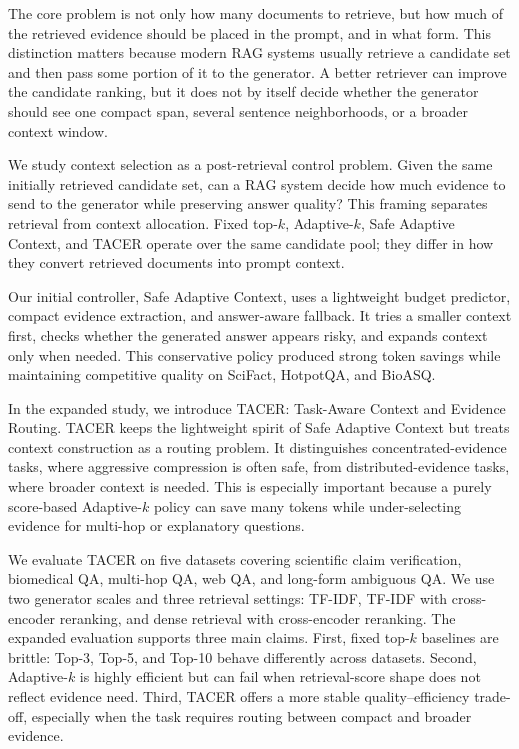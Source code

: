 \documentclass[11pt]{article}
\begin{document}
The core problem is not only how many documents to retrieve, but how much of the retrieved evidence should be placed in the prompt, and in what form. This distinction matters because modern RAG systems usually retrieve a candidate set and then pass some portion of it to the generator. A better retriever can improve the candidate ranking, but it does not by itself decide whether the generator should see one compact span, several sentence neighborhoods, or a broader context window.

We study context selection as a post-retrieval control problem. Given the same initially retrieved candidate set, can a RAG system decide how much evidence to send to the generator while preserving answer quality? This framing separates retrieval from context allocation. Fixed top-$k$, Adaptive-$k$, Safe Adaptive Context, and TACER operate over the same candidate pool; they differ in how they convert retrieved documents into prompt context.

Our initial controller, Safe Adaptive Context, uses a lightweight budget predictor, compact evidence extraction, and answer-aware fallback. It tries a smaller context first, checks whether the generated answer appears risky, and expands context only when needed. This conservative policy produced strong token savings while maintaining competitive quality on SciFact, HotpotQA, and BioASQ.

In the expanded study, we introduce TACER: Task-Aware Context and Evidence Routing. TACER keeps the lightweight spirit of Safe Adaptive Context but treats context construction as a routing problem. It distinguishes concentrated-evidence tasks, where aggressive compression is often safe, from distributed-evidence tasks, where broader context is needed. This is especially important because a purely score-based Adaptive-$k$ policy can save many tokens while under-selecting evidence for multi-hop or explanatory questions.

We evaluate TACER on five datasets covering scientific claim verification, biomedical QA, multi-hop QA, web QA, and long-form ambiguous QA. We use two generator scales and three retrieval settings: TF-IDF, TF-IDF with cross-encoder reranking, and dense retrieval with cross-encoder reranking. The expanded evaluation supports three main claims. First, fixed top-$k$ baselines are brittle: Top-3, Top-5, and Top-10 behave differently across datasets. Second, Adaptive-$k$ is highly efficient but can fail when retrieval-score shape does not reflect evidence need. Third, TACER offers a more stable quality--efficiency trade-off, especially when the task requires routing between compact and broader evidence.
\end{document}
